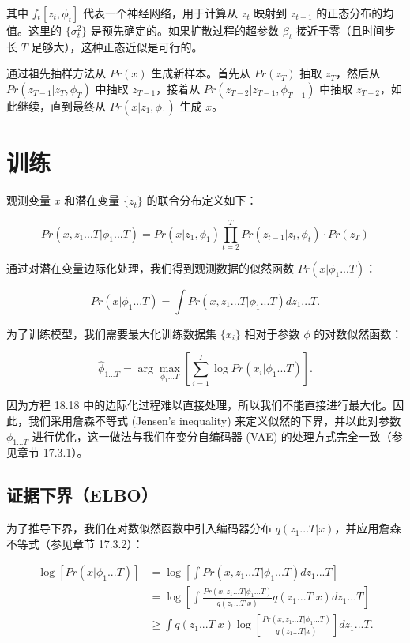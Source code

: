 其中 \(f_t[z_t, \phi_t]\) 代表一个神经网络，用于计算从 \(z_t\) 映射到 \(z_{t-1}\) 的正态分布的均值。这里的 \(\{\sigma_t^2\}\) 是预先确定的。如果扩散过程的超参数 \(\beta_t\) 接近于零（且时间步长 \(T\) 足够大），这种正态近似是可行的。

通过祖先抽样方法从 \(Pr(x)\) 生成新样本。首先从 \(Pr(z_T)\) 抽取 \(z_T\)，然后从 \(Pr(z_{T-1}|z_T, \phi_T)\) 中抽取 \(z_{T-1}\)，接着从 \(Pr(z_{T-2}|z_{T-1}, \phi_{T-1})\) 中抽取 \(z_{T-2}\)，如此继续，直到最终从 \(Pr(x|z_1, \phi_1)\) 生成 \(x\)。

\section{训练}
观测变量 \(x\) 和潜在变量 \(\{z_t\}\) 的联合分布定义如下：

\begin{equation}
Pr(x, z_1...T|\phi_1...T) = Pr(x|z_1, \phi_1) \prod_{t=2}^{T} Pr(z_{t-1}|z_t, \phi_t) \cdot Pr(z_T) 
\end{equation}

通过对潜在变量边际化处理，我们得到观测数据的似然函数 \(Pr(x|\phi_1...T)\)：

\begin{equation}
Pr(x|\phi_1...T) = \int Pr(x, z_1...T|\phi_1...T)dz_1...T. 
\end{equation}

为了训练模型，我们需要最大化训练数据集 \(\{x_i\}\) 相对于参数 \(\phi\) 的对数似然函数：

\begin{equation}
\hat{\phi}_{1...T} = \arg\max_{\phi_1...T} \left[ \sum_{i=1}^{I} \log Pr(x_i|\phi_1...T) \right]. 
\end{equation}

因为方程 18.18 中的边际化过程难以直接处理，所以我们不能直接进行最大化。因此，我们采用詹森不等式 (Jensen's inequality) 来定义似然的下界，并以此对参数 \(\phi_{1...T}\) 进行优化，这一做法与我们在变分自编码器 (VAE) 的处理方式完全一致（参见章节 17.3.1）。

\subsection{证据下界（ELBO）}
为了推导下界，我们在对数似然函数中引入编码器分布 \(q(z_1...T|x)\)，并应用詹森不等式（参见章节 17.3.2）：


\begin{align}
\log \left[ Pr(x|\phi_1...T) \right] &= \log \left[ \int Pr(x, z_1...T|\phi_1...T)dz_1...T \right] \\
&= \log \left[ \int \frac{Pr(x, z_1...T|\phi_1...T)}{q(z_1...T|x)} q(z_1...T|x) dz_1...T \right] \\
&\geq \int q(z_1...T|x) \log \left[ \frac{Pr(x, z_1...T|\phi_1...T)}{q(z_1...T|x)} \right] dz_1...T. 
\end{align} 


